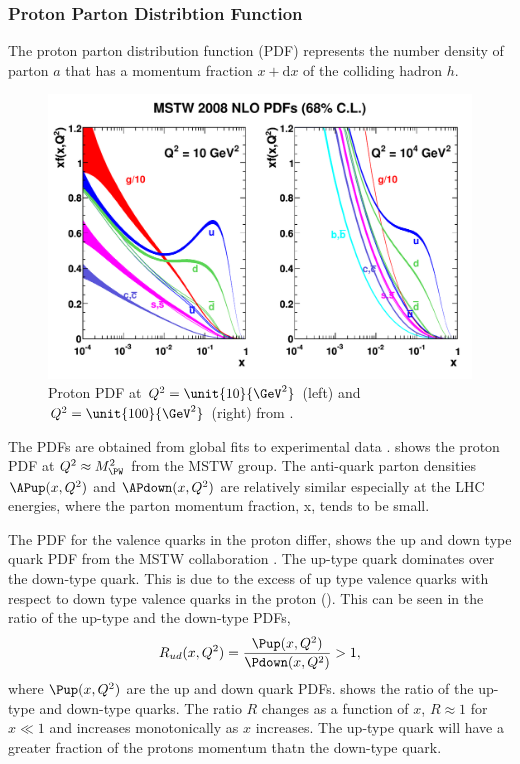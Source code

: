 \subsubsection*{Proton Parton Distribtion Function} 
The proton parton distribution function (PDF) represents the number density of
parton $a$ that has a momentum fraction $x+\mathrm{d}x$ of the colliding hadron
$h$.  


\begin{figure}[htbp]
  \centering
  \includegraphics[width=\textwidth]{mstw2008nlo68cl_allpdfs}
  \caption{Proton PDF at  $ Q^2 = \unit{ 10  }{\GeV^2} $ (left) 
                      and $ Q^2 = \unit{ 100  }{\GeV^2} $ (right) 
                     from \cite{Martin:2009iq}. }
  \label{wbos:pdf}
\end{figure}

The {PDFs} are obtained
from global fits to experimental data \cite{Martin:2009iq}.
 shows the proton PDF at $Q^2\approx M_{\PW}^2$ from the
MSTW group.
The anti-quark parton densities $\APup(x,Q^2)$ and $\APdown(x,Q^2)$ are
relatively similar especially at the LHC energies, where the parton momentum
fraction, x, tends to be small.

The {PDF} for the valence quarks in the proton differ, 
 shows the up and down
type quark PDF from the MSTW collaboration \cite{martin2009parton}.
The up-type quark dominates over the down-type quark.
This is due to the excess of up type valence quarks with respect to down type
valence quarks in the proton (\HepProcess{\Pup\Pup\Pdown}). 
This can be seen in the ratio of the up-type and the down-type {PDFs},
\begin{equation}
  R_{ud}(x,Q^2) = \frac{\Pup(x,Q^2)}{ \Pdown(x,Q^2)} > 1,
\end{equation}
where $\Pup(x,Q^2)$ are the up and down quark {PDFs}.
 shows the ratio of the up-type and down-type
quarks.  The ratio $R$ changes as a function of $x$, $R \approx 1$ for $x \ll 1$
and increases monotonically as $x$ increases.  The up-type quark will have a
greater fraction of the protons momentum thatn the down-type quark.

